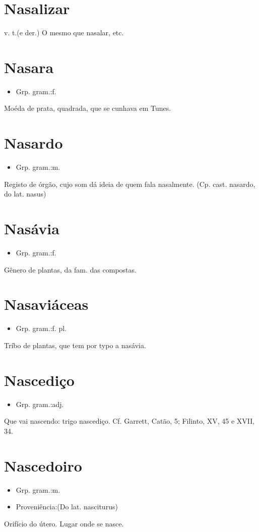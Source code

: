 \section{Nasalizar}
\textunderscore v. t.\textunderscore  (e der.)
O mesmo que \textunderscore nasalar\textunderscore , etc.
\section{Nasara}
\begin{itemize}
\item {Grp. gram.:f.}
\end{itemize}
Moéda de prata, quadrada, que se cunhava em Tunes.
\section{Nasardo}
\begin{itemize}
\item {Grp. gram.:m.}
\end{itemize}
Registo de órgão, cujo som dá ideia de quem fala nasalmente.
(Cp. cast. \textunderscore nasardo\textunderscore , do lat. \textunderscore nasus\textunderscore )
\section{Nasávia}
\begin{itemize}
\item {Grp. gram.:f.}
\end{itemize}
Gênero de plantas, da fam. das compostas.
\section{Nasaviáceas}
\begin{itemize}
\item {Grp. gram.:f. pl.}
\end{itemize}
Tríbo de plantas, que tem por typo a nasávia.
\section{Nascediço}
\begin{itemize}
\item {Grp. gram.:adj.}
\end{itemize}
Que vai nascendo: \textunderscore trigo nascediço\textunderscore . Cf. Garrett, \textunderscore Catão\textunderscore , 5; Filinto, XV, 45 e XVII, 34.
\section{Nascedoiro}
\begin{itemize}
\item {Grp. gram.:m.}
\end{itemize}
\begin{itemize}
\item {Proveniência:(Do lat. \textunderscore nasciturus\textunderscore )}
\end{itemize}
Orifício do útero.
Lugar onde se nasce.
